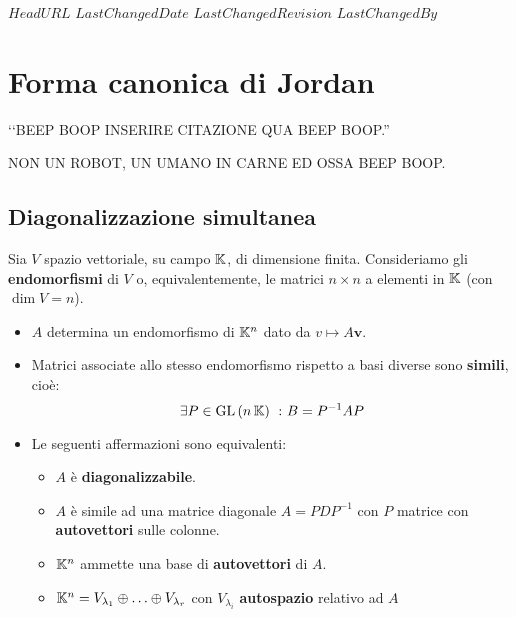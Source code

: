 \svnidlong
{$HeadURL$}
{$LastChangedDate$}
{$LastChangedRevision$}
{$LastChangedBy$}

\chapter{Forma canonica di Jordan}

\begin{introduction}
	‘‘BEEP BOOP INSERIRE CITAZIONE QUA BEEP BOOP.''
	\begin{flushright}
		\textsc{NON UN ROBOT,} UN UMANO IN CARNE ED OSSA BEEP BOOP.
	\end{flushright}
\end{introduction}
\section{Diagonalizzazione simultanea}
\begin{remember}
	Sia $V$ spazio vettoriale, su campo $\mathbb{K}$, di dimensione finita. Consideriamo gli \textbf{endomorfismi} di $V$ o, equivalentemente, le matrici $n\times n$ a elementi in $\mathbb{K}$ (con $\dim V=n$).
	\begin{itemize}
		\item $A$ determina un endomorfismo di $\mathbb{K}^n$ dato da $v\mapsto A\mathbf{v}$.
		\item Matrici associate allo stesso endomorfismo rispetto a basi diverse sono \textbf{simili}, cioè:
		\begin{equation}
			\exists P\in\operatorname{GL}\left(n\, \mathbb{K}\right)\ \colon B=P^{-1}AP
		\end{equation}
		\item Le seguenti affermazioni sono equivalenti:
		\begin{itemize}
			\item $A$ è \textbf{diagonalizzabile}.
			\item $A$ è simile ad una matrice diagonale $A=PDP^{-1}$ con $P$ matrice con \textbf{autovettori} sulle colonne.
			\item $\mathbb{K}^n$ ammette una base di \textbf{autovettori} di $A$.
			\item $\mathbb{K}^n=V_{\lambda_1}\oplus\ldots\oplus V_{\lambda_r}$ con $V_{\lambda_i}$ \textbf{autospazio} relativo ad $A$
		\end{itemize}
	\end{itemize}
\vspace{-3mm}
\end{remember}
